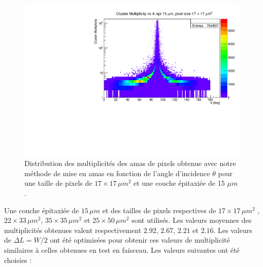 %   
%   
  \begin{figure}[!htb]
    \begin{center}
      \includegraphics[scale=0.62]{./figures/MVs_Beamstrahlung/miniVectorsStudy/Multiplicity_vs_theta_epi15um_pixel17_17_um.pdf}
      \caption{Distribution des multiplicit\'es des amas de pixels obtenue avec notre m\'ethode de mise en amas en fonction de l'angle d'incidence $\theta$ pour une taille de pixels de $17 \times 17 \, \mu m^2$ et une couche \'epitaxi\'ee de 15 $\mu m$.}
      \label{fig:clusterMulti_epi15_17_17_vs_theta}
    \end{center}
  \end{figure}
  
  
  \medskip
  
  Une couche \'epitaxi\'ee de $15 \, \mu m$ et des tailles de pixels respectives de  $17 \times 17 \, \mu m^2$ , $22 \times 33 \, \mu m^2$, $35 \times 35 \, \mu m^2$ et $25 \times 50 \, \mu m^2$ sont utilis\'es. Les valeurs moyennes des multiplicit\'es obtenues valent respectivement $2.92$, $2.67$, $2.21$ et $2.16$. Les valeurs de $\Delta L = W/2$ ont \'et\'e optimis\'ees pour obtenir ces valeurs de multiplicit\'e similaires \`a celles obtenues en test en faisceau. Les valeurs suivantes ont \'et\'e choisies : 
  
